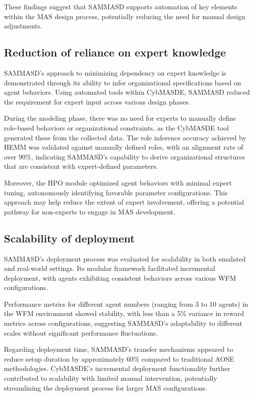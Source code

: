 \documentclass[conference]{IEEEtran}
\begin{document}
These findings suggest that SAMMASD supports automation of key elements within the MAS design process, potentially reducing the need for manual design adjustments.

\subsection{Reduction of reliance on expert knowledge}

SAMMASD’s approach to minimizing dependency on expert knowledge is demonstrated through its ability to infer organizational specifications based on agent behaviors. Using automated tools within CybMASDE, SAMMASD reduced the requirement for expert input across various design phases.

During the modeling phase, there was no need for experts to manually define role-based behaviors or organizational constraints, as the CybMASDE tool generated these from the collected data. The role inference accuracy achieved by HEMM was validated against manually defined roles, with an alignment rate of over 90\%, indicating SAMMASD’s capability to derive organizational structures that are consistent with expert-defined parameters. 

Moreover, the HPO module optimized agent behaviors with minimal expert tuning, autonomously identifying favorable parameter configurations. This approach may help reduce the extent of expert involvement, offering a potential pathway for non-experts to engage in MAS development.

\subsection{Scalability of deployment}

SAMMASD’s deployment process was evaluated for scalability in both emulated and real-world settings. Its modular framework facilitated incremental deployment, with agents exhibiting consistent behaviors across various WFM configurations.

Performance metrics for different agent numbers (ranging from 3 to 10 agents) in the WFM environment showed stability, with less than a 5\% variance in reward metrics across configurations, suggesting SAMMASD’s adaptability to different scales without significant performance fluctuations.

Regarding deployment time, SAMMASD’s transfer mechanisms appeared to reduce setup duration by approximately 60\% compared to traditional AOSE methodologies. CybMASDE’s incremental deployment functionality further contributed to scalability with limited manual intervention, potentially streamlining the deployment process for larger MAS configurations.
\end{document}

